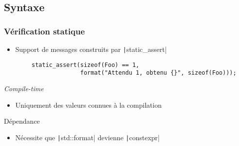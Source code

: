 \documentclass[C++.tex]{subfiles}
\begin{document}
\subsection*{Syntaxe}
\begin{frame}[fragile]
	\frametitle{Vérification statique}
	\begin{itemize}
		\item Support de messages construits par \texttt|static_assert|
	\end{itemize}

	\begin{verbatim}
		static_assert(sizeof(Foo) == 1,
		              format("Attendu 1, obtenu {}", sizeof(Foo)));
	\end{verbatim}

	\begin{alertblock}{\textit{Compile-time}}
		\begin{itemize}
			\item Uniquement des valeurs connues à la compilation
		\end{itemize}
	\end{alertblock}

	\begin{alertblock}{Dépendance}
		\begin{itemize}
			\item Nécessite que \texttt|std::format| devienne \texttt|constexpr|
		\end{itemize}
	\end{alertblock}

\end{frame}
\end{document}

